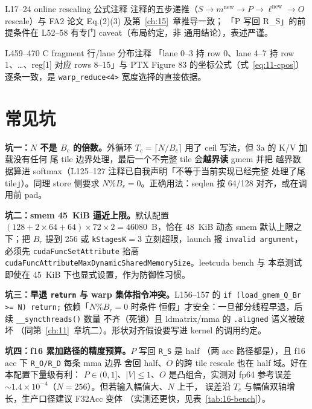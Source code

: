 \begin{kaogu}[F3 核校通过]{L17--24 online rescaling 公式注释}
  注释的五步递推（$S\to m^{\text{new}}\to P\to \ell^{\text{new}}\to O$
  rescale）与 FA2 论文 Eq.(2)(3) 及第~\ref{ch:15}~章推导一致；
  「P 写回 R\_S」的前提条件在 L52--58 有专门 caveat（布局约定，非
  通用结论），表述严谨。
\end{kaogu}

\begin{kaogu}[F2 核校通过]{L459--470 C fragment 行/lane 分布注释}
  「lane 0--3 持 row 0、lane 4--7 持 row 1、\ldots、reg[1] 对应
  rows 8--15」与 PTX Figure 83 的坐标公式（式~\ref{eq:11-cpos}）
  逐条一致，是 \texttt{warp\_\allowbreak{}reduce\allowbreak{}<4>} 宽度选择的直接依据。
\end{kaogu}

\section{常见坑}

\textbf{坑一：$N$ 不是 $B_c$ 的倍数。}外循环
$T_c=\lceil N/B_c\rceil$ 用了 ceil 写法，但 3a 的 K/V 加载没有任何
尾 tile 边界处理，最后一个不完整 tile 会\textbf{越界读} gmem 并把
越界数据算进 softmax（L125--127 注释已自我声明「不等于当前实现已经完整
处理了尾 tile」）。同理 store 侧要求 $N\%B_r=0$。正确用法：seqlen
按 64/128 对齐，或在调用前 pad。

\textbf{坑二：smem 45~KiB 逼近上限。}默认配置
$(128{+}2{\times}64{+}64)\times72\times2 = 46080$~B，恰在 48~KiB
动态 smem 默认上限之下；把 $B_r$ 提到 256 或 \texttt{kStagesK}$=$3
立刻超限，launch 报 \texttt{invalid argument}，必须先
\texttt{cuda\allowbreak{}Func\allowbreak{}Set\allowbreak{}Attribute} 抬高
\texttt{cuda\allowbreak{}Func\allowbreak{}Attribute\allowbreak{}Max\allowbreak{}Dynamic\allowbreak{}Shared\allowbreak{}Memory\allowbreak{}Size}。leetcuda bench 与
本章测试即使在 45~KiB 下也显式设置，作为防御性习惯。

\textbf{坑三：早退 \texttt{return} 与 warp 集体指令冲突。}\allowbreak{}L156--157 的
\texttt{if \allowbreak{}(load\_\allowbreak{}gmem\_\allowbreak{}Q\_\allowbreak{}Br >=\allowbreak{} N) return;} 依赖「$N\%B_r=0$ 时条件
恒假」才安全：一旦部分线程早退，后续 \texttt{\_\allowbreak{}\_\allowbreak{}syncthreads\allowbreak{}()} 数量
不齐（死锁）且 ldmatrix/mma 的 \texttt{.aligned} 语义被破坏
（同第~\ref{ch:11}~章坑二）。形状对齐假设要写进 kernel 的调用约定。

\textbf{坑四：f16 累加路径的精度预算。}$P$ 写回 \texttt{R\_S} 是 half
（两 acc 路径都是），且 f16 acc 下 \texttt{R\_O/R\_D} 每条 mma 边界
舍回 half、$O$ 的跨 tile rescale 也在 half 域。好在本配置下量级有利：
$P\in(0,1]$、$|V|\le 1$、$O$ 是凸组合，实测对 fp64 参考误差
$\sim 1.4\times10^{-4}$（$N{=}256$）。但若输入幅值大、$N$ 上千，
误差沿 $T_c$ 与幅值双轴增长，生产口径建议 F32Acc 变体
（实测还更快，见表~\ref{tab:16-bench}）。

